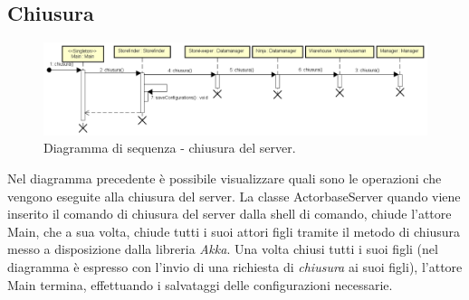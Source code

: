 \documentclass[a4paper]{article}
\begin{document}
       \subsection{Chiusura}
            \begin{figure} [H]
				\centering
				\includegraphics[width=\textwidth]{ST/seq/Chiusura.png}
				\caption{Diagramma di sequenza - chiusura del server.}
			\end{figure}
            Nel diagramma precedente è possibile visualizzare quali sono le operazioni che vengono eseguite alla chiusura del server. La classe ActorbaseServer 
            quando viene inserito il comando di chiusura del server dalla shell di comando, chiude l'attore Main, che a sua volta, chiude tutti i suoi attori 
            figli tramite il metodo di chiusura messo a disposizione dalla libreria \textit{Akka}. Una volta chiusi tutti i suoi figli (nel diagramma è espresso 
            con l'invio di una richiesta di \textit{chiusura} ai suoi figli), l'attore Main termina, effettuando i salvataggi delle configurazioni necessarie.
            
\end{document}
